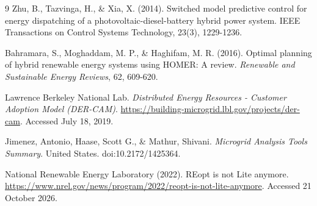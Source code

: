 \documentclass[final,3p,times]{elsarticle}
\begin{document}
\begin{thebibliography}{9}
Zhu, B., Tazvinga, H., \& Xia, X. (2014). Switched model predictive control for energy dispatching of a photovoltaic-diesel-battery hybrid power system. IEEE Transactions on Control Systems Technology, 23(3), 1229-1236.

Bahramara, S., Moghaddam, M. P., \& Haghifam, M. R. (2016). Optimal planning of hybrid renewable energy systems using HOMER: A review. \textit{Renewable and Sustainable Energy Reviews}, 62, 609-620.

Lawrence Berkeley National Lab. \textit{Distributed Energy Resources - Customer Adoption Model (DER-CAM)}. \url{https://building-microgrid.lbl.gov/projects/der-cam}. Accessed July 18, 2019.

Jimenez, Antonio, Haase, Scott G., \& Mathur, Shivani. \textit{Microgrid Analysis Tools Summary}. United States. doi:10.2172/1425364.

National Renewable Energy Laboratory (2022). REopt is not Lite anymore. \url{https://www.nrel.gov/news/program/2022/reopt-is-not-lite-anymore}. Accessed 21 October 2026.

\end{thebibliography}
\end{document}
